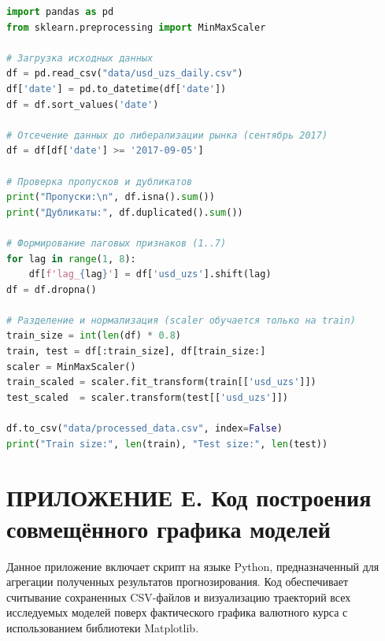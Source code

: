 \begin{lstlisting}[language=Python, basicstyle=\small\ttfamily, breaklines=true]
import pandas as pd
from sklearn.preprocessing import MinMaxScaler
 
# Загрузка исходных данных
df = pd.read_csv("data/usd_uzs_daily.csv")
df['date'] = pd.to_datetime(df['date'])
df = df.sort_values('date')
 
# Отсечение данных до либерализации рынка (сентябрь 2017)
df = df[df['date'] >= '2017-09-05']
 
# Проверка пропусков и дубликатов
print("Пропуски:\n", df.isna().sum())
print("Дубликаты:", df.duplicated().sum())
 
# Формирование лаговых признаков (1..7)
for lag in range(1, 8):
    df[f'lag_{lag}'] = df['usd_uzs'].shift(lag)
df = df.dropna()
 
# Разделение и нормализация (scaler обучается только на train)
train_size = int(len(df) * 0.8)
train, test = df[:train_size], df[train_size:]
scaler = MinMaxScaler()
train_scaled = scaler.fit_transform(train[['usd_uzs']])
test_scaled  = scaler.transform(test[['usd_uzs']])
 
df.to_csv("data/processed_data.csv", index=False)
print("Train size:", len(train), "Test size:", len(test))
\end{lstlisting}
 
\section*{ПРИЛОЖЕНИЕ Е. Код построения совмещённого графика моделей}
\label{app:plot}

Данное приложение включает скрипт на языке Python, предназначенный для агрегации полученных результатов прогнозирования. Код обеспечивает считывание сохраненных CSV-файлов и визуализацию траекторий всех исследуемых моделей поверх фактического графика валютного курса с использованием библиотеки Matplotlib.
 
